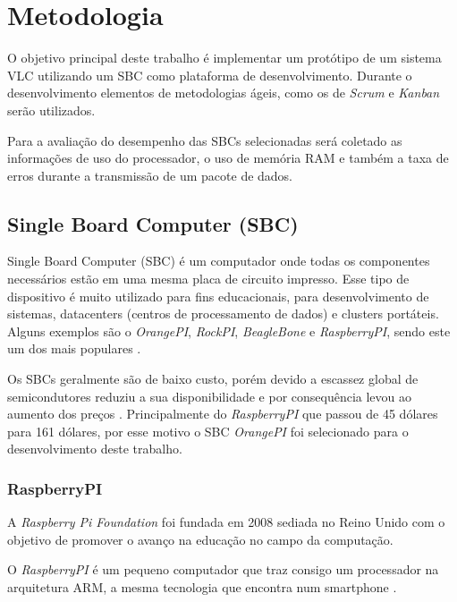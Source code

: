 \chapter{Metodologia}

O objetivo principal deste trabalho é implementar um protótipo de um sistema VLC utilizando um SBC como plataforma de desenvolvimento. Durante o desenvolvimento elementos de metodologias ágeis, como os de \textit{Scrum} e \textit{Kanban} serão utilizados.

Para a avaliação do desempenho das SBCs selecionadas será coletado as informações de uso do processador, o uso de memória RAM e também a taxa de erros durante a transmissão de um pacote de dados.

\section{Single Board Computer (SBC)}

Single Board Computer (SBC) é um computador onde todas os componentes necessários estão em uma mesma placa de circuito impresso. Esse tipo de dispositivo é muito utilizado para fins educacionais, para desenvolvimento de sistemas, datacenters (centros  de  processamento  de  dados) e clusters portáteis. Alguns exemplos são o \textit{OrangePI}, \textit{RockPI}, \textit{BeagleBone} e \textit{RaspberryPI}, sendo este um dos mais populares \cite{SBC_edu}.

Os SBCs geralmente são de baixo custo, porém devido a escassez global de semicondutores reduziu a sua disponibilidade e por consequência levou ao aumento dos preços \cite{zeng_2022}. Principalmente do \textit{RaspberryPI} que passou de 45 dólares para 161 dólares, por esse motivo o SBC \textit{OrangePI} foi selecionado para o desenvolvimento deste trabalho.

\subsection{RaspberryPI}

A \textit{Raspberry Pi Foundation} foi fundada em 2008 sediada no Reino Unido com o objetivo de promover o avanço na educação no campo da computação. \cite{rasp}

O \textit{RaspberryPI} é um pequeno computador que traz consigo um processador na arquitetura ARM, a mesma tecnologia que encontra num smartphone \cite{rasp}.

